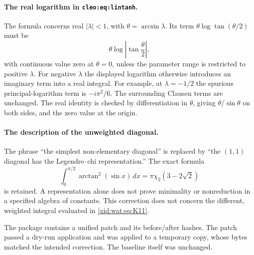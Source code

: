 \documentclass[11pt,a4paper]{article}
\numberwithin{equation}{section}
\theoremstyle{definition}
\theoremstyle{remark}
\begin{document}
\paragraph{The real logarithm in \texttt{cleo:eq:lintanh}.}
The formula concerns real $|\lambda|<1$, with
$\theta=\arcsin\lambda$. Its term
$\theta\log\tan(\theta/2)$ must be
\[
 \theta\log\left|\tan\frac\theta2\right|,
\]
with continuous value zero at $\theta=0$, unless the parameter range is
restricted to positive $\lambda$. For negative $\lambda$ the displayed
logarithm otherwise introduces an imaginary term into a real integral.
For example, at $\lambda=-1/2$ the spurious principal-logarithm term is
$-i\pi^2/6$. The surrounding Clausen terms are unchanged. The real
identity is checked by differentiation in $\theta$, giving
$\theta/\sin\theta$ on both sides, and the zero value at the origin.

\paragraph{The description of the unweighted diagonal.}
The phrase ``the simplest non-elementary diagonal'' is replaced by
``the $(1,1)$ diagonal has the Legendre--chi representation.'' The exact
formula
\[
 \int_0^{\pi/2}\arctan^2(\sin x)\,dx
       =\pi\chi_2(3-2\sqrt2)
\]
is retained. A representation alone does not prove minimality or
nonreduction in a specified algebra of constants. This correction does
not concern the different, weighted integral evaluated in
\eqref{xid:wat:eq:K11}.

\medskip
\noindent The package contains a unified patch and its before/after
hashes. The patch passed a dry-run application and was applied to a
temporary copy, whose bytes matched the intended correction. The
baseline itself was unchanged.
\end{document}
